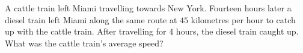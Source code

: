 A cattle train left Miami travelling towards New York. Fourteen hours later a diesel train left Miami along the same route at $45$ kilometres per hour to catch up with the cattle train. After travelling for $4$ hours, the diesel train caught up. What was the cattle train's average speed?
